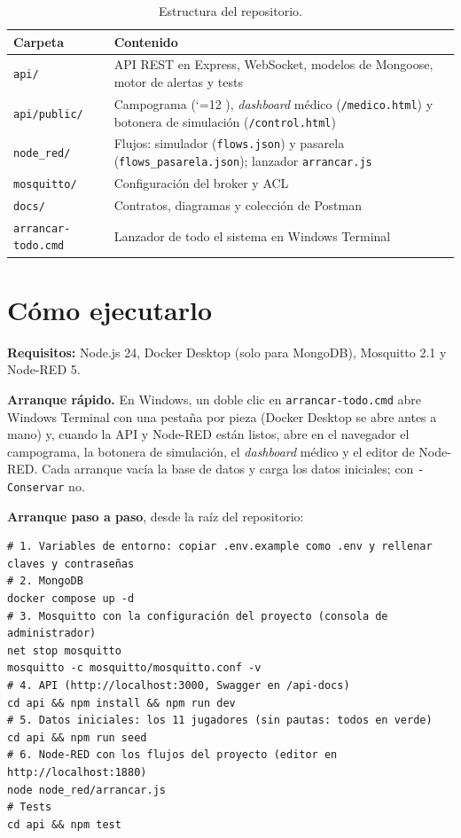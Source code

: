 \documentclass[runningheads]{llncs}
\renewcommand{\url}{\begingroup\catcode`\/=12 \urlconbarras}}
\newcommand{\urlconbarras}[1]{\urloriginal{#1}\endgroup}
\newcommand{\ruta}[1]{\texttt{#1}}
\begin{document}
\begin{table}[!htbp]
\centering
\caption{Estructura del repositorio.}\label{tab:repo}
\footnotesize
\begin{tabularx}{\textwidth}{p{3.6cm}L}
\toprule
\textbf{Carpeta} & \textbf{Contenido} \\
\midrule
\ruta{api/} & API REST en Express, WebSocket, modelos de Mongoose, motor de alertas y tests \\
\ruta{api/public/} & Campograma (\url{http://localhost:3000}), \emph{dashboard} médico (\texttt{/medico.html}) y botonera de simulación (\texttt{/control.html}) \\
\ruta{node\_red/} & Flujos: simulador (\texttt{flows.json}) y pasarela (\texttt{flows\_pasarela.json}); lanzador \texttt{arrancar.js} \\
\ruta{mosquitto/} & Configuración del broker y ACL \\
\ruta{docs/} & Contratos, diagramas y colección de Postman \\
\ruta{arrancar-todo.cmd} & Lanzador de todo el sistema en Windows Terminal \\
\bottomrule
\end{tabularx}
\end{table}

\section{Cómo ejecutarlo}

\textbf{Requisitos:} Node.js 24, Docker Desktop (solo para MongoDB), Mosquitto 2.1 y Node-RED 5.

\textbf{Arranque rápido.} En Windows, un doble clic en \texttt{arrancar-todo.cmd} abre Windows Terminal con una pestaña por pieza (Docker Desktop se abre antes a mano) y, cuando la API y Node-RED están listos, abre en el navegador el campograma, la botonera de simulación, el \emph{dashboard} médico y el editor de Node-RED. Cada arranque vacía la base de datos y carga los datos iniciales; con \texttt{-Conservar} no.

\textbf{Arranque paso a paso}, desde la raíz del repositorio:

\begin{lstlisting}[language=shell]
# 1. Variables de entorno: copiar .env.example como .env y rellenar claves y contraseñas
# 2. MongoDB
docker compose up -d
# 3. Mosquitto con la configuración del proyecto (consola de administrador)
net stop mosquitto
mosquitto -c mosquitto/mosquitto.conf -v
# 4. API (http://localhost:3000, Swagger en /api-docs)
cd api && npm install && npm run dev
# 5. Datos iniciales: los 11 jugadores (sin pautas: todos en verde)
cd api && npm run seed
# 6. Node-RED con los flujos del proyecto (editor en http://localhost:1880)
node node_red/arrancar.js
# Tests
cd api && npm test
\end{lstlisting}
\end{document}
